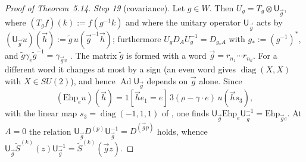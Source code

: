 \documentclass[11pt,letterpaper,reqno]{amsart}
\theoremstyle{definition}
\begin{document}
\begin{proof}[Proof of Theorem~5.14]
\emph{Step 19} (covariance).
Let $g\in W$.
Then $U_g=T_g\otimes\mathsf U_{\vec g}$, where $(T_gf)(k):=f(g^{-1}k)$ and where the unitary operator $\mathsf U_{\vec g}$ acts by $(\mathsf U_{\vec g}u)(\vec h):=\tilde g\,u(\vec g^{-1}\vec h)$; furthermore $U_gD_AU_g^{-1}=D_{g_*A}$ with $g_*:=(g^{-1})^*$, and $\tilde g\gamma_v\tilde g^{-1}=\gamma_{\vec gv}$ \cite[Proposition~3.16\,(b)]{QEDII}.
The matrix $\tilde g$ is formed with a word $\vec g=r_{n_1}\cdots r_{n_k}$.
For a different word it changes at most by a sign (an even word gives $\operatorname{diag}(X,X)$ with $X\in SU(2)$), and hence $\operatorname{Ad}\mathsf U_{\vec g}$ depends on $\vec g$ alone.
Since
\begin{equation*}
(\mathrm{Ehp}_eu)(\vec h)=1[\vec he_1=e]\,3(\rho-\gamma\cdot e)\,u(\vec hs_3),
\end{equation*}
with the linear map $s_3=\operatorname{diag}(-1,1,1)$ of \cite{QEDIII}, one finds $\mathsf U_{\vec g}\mathrm{Ehp}_e\mathsf U_{\vec g}^{-1}=\allowbreak \mathrm{Ehp}_{\vec ge}$.
At $A=0$ the relation $\mathsf U_{\vec g}D^{(p)}\mathsf U_{\vec g}^{-1}=D^{(\vec gp)}$ holds, whence $\mathsf U_{\vec g}\tilde S^{(k)}(z)\mathsf U_{\vec g}^{-1}=\allowbreak \tilde S^{(k)}(\vec gz)$.


\end{proof}
\end{document}
